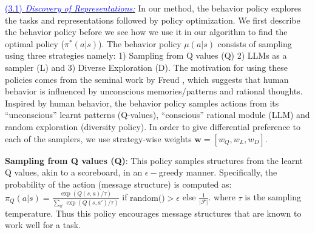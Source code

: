 \noindent \underline{\textcolor{blue}{(3.1) \emph{Discovery of Representations:}}}
In our method, the behavior policy explores the tasks and representations followed by policy optimization. We first describe the behavior policy before we see how we use it in our algorithm to find the optimal policy ($\pi^*(a|s)$). The behavior policy $\mu(a|s)$ consists of sampling using three strategies namely: 1) Sampling from Q values (Q) 2) LLMs as a sampler (L) and 3) Diverse Exploration (D).
The motivation for using these policies comes from the seminal work by Freud \cite{freud1989ego}, which suggests that human behavior is influenced by unconscious memories/patterns and rational thoughts. Inspired by human behavior, the behavior policy samples actions from its ``unconscious'' learnt patterns (Q-values), ``conscious'' rational module (LLM) and random exploration (diversity policy).
In order to give differential preference to each of the samplers, we use strategy-wise weights $\mathbf{w} = [w_Q, w_L, w_D]$. 

\noindent \textbf{Sampling from Q values (Q)}: 
This policy samples structures from the learnt Q values, akin to a scoreboard, in an $\epsilon-$greedy manner. Specifically, the probability of the action (message structure) is computed as:
$\pi_Q(a|s) = \frac{\exp(Q(s,a)/\tau)}{\sum_{a'} \exp(Q(s,a')/\tau)}$ if $\text{random()}>\epsilon$ else $\frac{1}{\lvert \mathcal{F} \lvert}$.
where $\tau$ is the sampling temperature. Thus this policy encourages message structures that are known to work well for a task.

